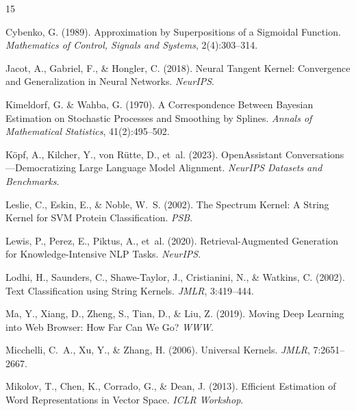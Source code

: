 \documentclass[11pt,a4paper]{article}
\begin{document}

\begin{thebibliography}{15}

Cybenko, G. (1989).
\newblock Approximation by Superpositions of a Sigmoidal Function.
\newblock \emph{Mathematics of Control, Signals and Systems}, 2(4):303--314.

Jacot, A., Gabriel, F., \& Hongler, C. (2018).
\newblock Neural Tangent Kernel: Convergence and Generalization in Neural Networks.
\newblock \emph{NeurIPS}.

Kimeldorf, G. \& Wahba, G. (1970).
\newblock A Correspondence Between Bayesian Estimation on Stochastic Processes and Smoothing by Splines.
\newblock \emph{Annals of Mathematical Statistics}, 41(2):495--502.

K\"opf, A., Kilcher, Y., von R\"utte, D., et~al. (2023).
\newblock OpenAssistant Conversations---Democratizing Large Language Model Alignment.
\newblock \emph{NeurIPS Datasets and Benchmarks}.

Leslie, C., Eskin, E., \& Noble, W.~S. (2002).
\newblock The Spectrum Kernel: A String Kernel for SVM Protein Classification.
\newblock \emph{PSB}.

Lewis, P., Perez, E., Piktus, A., et~al. (2020).
\newblock Retrieval-Augmented Generation for Knowledge-Intensive NLP Tasks.
\newblock \emph{NeurIPS}.

Lodhi, H., Saunders, C., Shawe-Taylor, J., Cristianini, N., \& Watkins, C. (2002).
\newblock Text Classification using String Kernels.
\newblock \emph{JMLR}, 3:419--444.

Ma, Y., Xiang, D., Zheng, S., Tian, D., \& Liu, Z. (2019).
\newblock Moving Deep Learning into Web Browser: How Far Can We Go?
\newblock \emph{WWW}.

Micchelli, C.~A., Xu, Y., \& Zhang, H. (2006).
\newblock Universal Kernels.
\newblock \emph{JMLR}, 7:2651--2667.

Mikolov, T., Chen, K., Corrado, G., \& Dean, J. (2013).
\newblock Efficient Estimation of Word Representations in Vector Space.
\newblock \emph{ICLR Workshop}.


\end{thebibliography}
\end{document}
